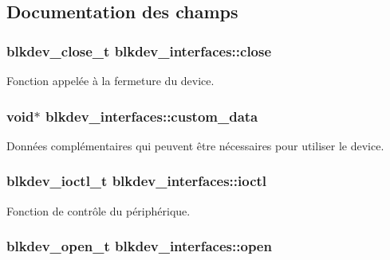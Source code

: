 \subsection{Documentation des champs}
\hypertarget{structblkdev__interfaces_ab7623005e31211894853b3524e1e74eb}{
\subsubsection[{close}]{\setlength{\rightskip}{0pt plus 5cm}blkdev\+\_\+close\+\_\+t blkdev\+\_\+interfaces\+::close}}\label{structblkdev__interfaces_ab7623005e31211894853b3524e1e74eb}
Fonction appelée à la fermeture du device. \hypertarget{structblkdev__interfaces_a8eea79e70042c41cc171796b501a9fd1}{
\subsubsection[{custom\+\_\+data}]{\setlength{\rightskip}{0pt plus 5cm}void$\ast$ blkdev\+\_\+interfaces\+::custom\+\_\+data}}\label{structblkdev__interfaces_a8eea79e70042c41cc171796b501a9fd1}
Données complémentaires qui peuvent être nécessaires pour utiliser le device. \hypertarget{structblkdev__interfaces_ae93720624e6f1a1ea33e31bf1da4c097}{
\subsubsection[{ioctl}]{\setlength{\rightskip}{0pt plus 5cm}blkdev\+\_\+ioctl\+\_\+t blkdev\+\_\+interfaces\+::ioctl}}\label{structblkdev__interfaces_ae93720624e6f1a1ea33e31bf1da4c097}
Fonction de contrôle du périphérique. \hypertarget{structblkdev__interfaces_a08eaa39b105826d2780991b32577867a}{
\subsubsection[{open}]{\setlength{\rightskip}{0pt plus 5cm}blkdev\+\_\+open\+\_\+t blkdev\+\_\+interfaces\+::open}}\label{structblkdev__interfaces_a08eaa39b105826d2780991b32577867a}
